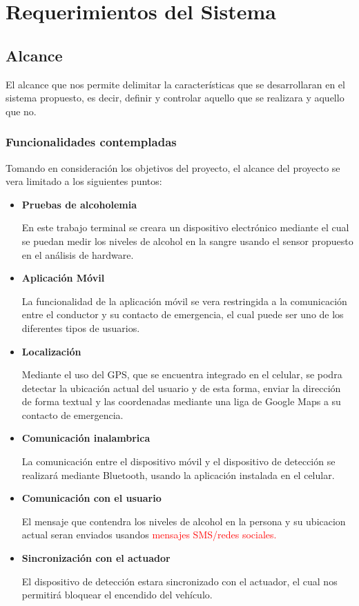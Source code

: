\section{Requerimientos del Sistema}
\subsection{Alcance}
El alcance que nos permite delimitar la características que se desarrollaran en el sistema propuesto, es decir,
definir y controlar aquello que se realizara y aquello que no.
	\subsubsection{Funcionalidades contempladas}
	Tomando en consideración los objetivos del proyecto, el alcance del proyecto se vera limitado a los siguientes puntos: \par
		\begin{itemize}
			 \item {\textbf{Pruebas de alcoholemia} \par En este trabajo terminal se creara un dispositivo electrónico mediante el cual se puedan medir los niveles de alcohol en la sangre usando el sensor propuesto en el análisis de hardware.}
			 \item {\textbf{Aplicación Móvil} \par La funcionalidad de la aplicación móvil se vera restringida a la comunicación entre el conductor y su contacto de emergencia, el cual puede ser uno de los diferentes tipos de usuarios.}
			 \item {\textbf{Localización} \par Mediante el uso del GPS, que se encuentra integrado en el celular, se podra detectar la ubicación actual del usuario y de esta forma, enviar la dirección de forma textual y las coordenadas mediante una liga de Google Maps a su contacto de emergencia.}
			 \item {\textbf{Comunicación inalambrica} \par La comunicación entre el dispositivo móvil y el dispositivo de detección se realizará mediante Bluetooth, usando la aplicación instalada en el celular.}
 			\item {\textbf{Comunicación con el usuario} \par El mensaje que contendra los niveles de alcohol en la persona y su ubicacion actual seran enviados usandos \textcolor{red}{mensajes SMS/redes sociales.}}
 			\item{\textbf{Sincronización con el actuador} \par El dispositivo de detección estara sincronizado con el actuador, el cual nos permitirá bloquear el encendido del vehículo.}
		\end{itemize}
